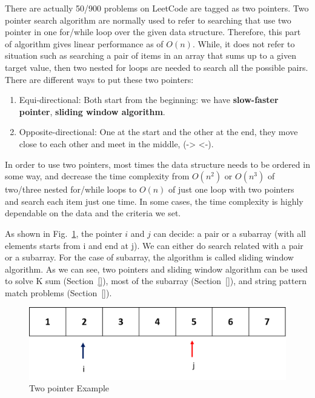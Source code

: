 \documentclass[../searching.tex]{subfiles}
\begin{document}


There are actually 50/900 problems on LeetCode are tagged as two pointers. Two pointer search algorithm are normally used to refer to searching that use two pointer in one for/while loop over the given data structure. Therefore, this part of algorithm gives linear performance as of $O(n)$. While, it does not refer to situation such as searching a pair of items in an array that sums up to a given target value, then two nested for loops are needed to search all the possible pairs. There are different ways to put these two pointers:
\begin{enumerate}
    \item Equi-directional:  Both start from the beginning: we have \textbf{slow-faster pointer}, \textbf{sliding window algorithm}.
    \item Opposite-directional: One at the start and the other at the end, they move close to each other and meet in the middle, (-> <-).
\end{enumerate}
In order to use two pointers, most times the data structure needs to be ordered in some way, and decrease the time complexity from $O(n^2)$ or $O(n^3)$ of two/three nested for/while loops to $O(n)$ of just one loop with two pointers and search each item just one time. In some cases, the time complexity is highly dependable on the data and the criteria we set. 

As shown in Fig.~\ref{fig:two pointer}, the pointer $i$ and $j$ can decide: a pair or a subarray (with all elements starts from i and end at j). We can either do search related with a pair or a subarray. For the case of subarray, the algorithm is called sliding window algorithm. As we can see, two pointers and sliding window algorithm can be used to solve K sum (Section~\ref{}), most of the subarray (Section~\ref{}), and string pattern match problems (Section~\ref{}). 
\begin{figure}[h!]
    \centering
    \includegraphics[width=0.9\columnwidth]{fig/two_pointers.png}
    \caption{Two pointer Example}
    \label{fig:two pointer}
\end{figure}
\end{document}
